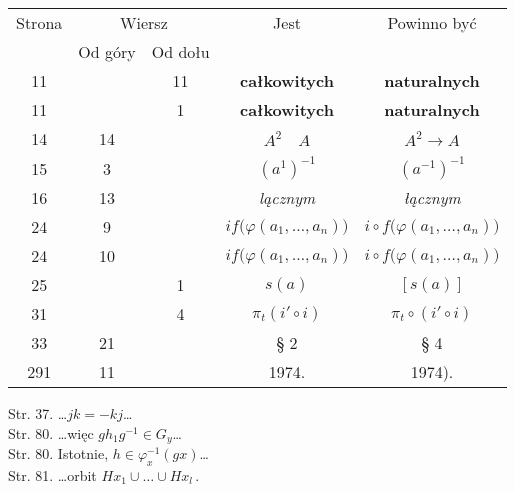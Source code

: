 \documentclass[a4paper,11pt]{article}
\numberwithin{equation}{section}
\begin{document}
\newpage



\begin{center}

  \begin{tabular}{|c|c|c|c|c|}
    \hline
    Strona & \multicolumn{2}{c|}{Wiersz} & Jest
                              & Powinno być \\ \cline{2-3}
    & Od góry & Od dołu & & \\
    \hline
    11  & & 11 & \textbf{całkowitych} & \textbf{naturalnych} \\
    11  & &  1 & \textbf{całkowitych} & \textbf{naturalnych} \\
    14  & 14 & & $A^{ 2 } \quad A$ & $A^{ 2 } \to A$ \\
    15  &  3 & & $( a^{ 1 } )^{ -1 }$ & $( a^{ -1 } )^{ -1 }$ \\
    16  & 13 & & \textit{lącznym} & \textit{łącznym} \\
    24  &  9 & & $if\big( \varphi( a_{ 1 }, \ldots, a_{ n } ) \big)$
           & $i \circ f\big( \varphi( a_{ 1 }, \ldots, a_{ n } ) \big)$ \\
    24  & 10 & & $if\big( \varphi( a_{ 1 }, \ldots, a_{ n } ) \big)$
           & $i \circ f\big( \varphi( a_{ 1 }, \ldots, a_{ n } ) \big)$ \\
    25  & &  1 & $s( a )$ & $[ s( a ) ]$ \\
    31  & &  4 & $\pi_{ t }( i' \circ i )$
           & $\pi_{ t } \circ ( i' \circ i )$ \\
    33  & 21 & & \S{} 2 & \S{} 4 \\
    291  & 11 & & 1974. & 1974). \\
    \hline
  \end{tabular}

\end{center}

\VerSpaceTwo


Str. 37. \ldots$j k = -k j$\ldots \\
Str. 80. \ldots więc $g h_{ 1 } g^{ -1 } \in G_{ y }$\ldots \\
Str. 80. Istotnie, $h \in \varphi_{ x }^{ -1 }( g x )$\ldots \\
Str. 81. \ldots orbit $H x_{ 1 } \cup \ldots \cup H x_{ l } \, .$
\end{document}
